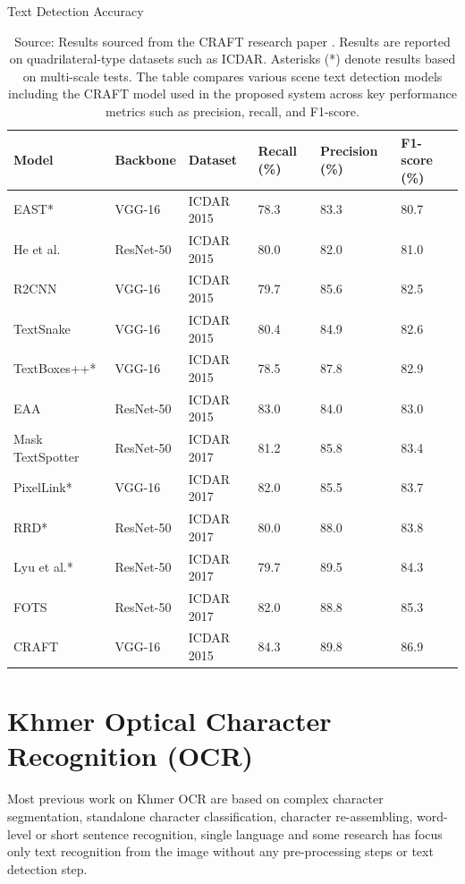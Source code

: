 {\begin{table}[H]
  \centering
  \caption{Text Detection Accuracy}
  \begin{tabularx}{\linewidth}{|L{3.5cm}|L{2.5cm}|L{2.5cm}|C{2cm}|C{2cm}|C{2cm}|}
    \hline
    \textbf{Model} & \textbf{Backbone} & \textbf{Dataset} & \textbf{Recall (\%)} & \textbf{Precision (\%)} & \textbf{F1-score (\%)} \\
    \hline
    EAST* & VGG-16 & ICDAR 2015 & 78.3 & 83.3 & 80.7 \\
    He et al. & ResNet-50 & ICDAR 2015 & 80.0 & 82.0 & 81.0 \\
    R2CNN & VGG-16 & ICDAR 2015 & 79.7 & 85.6 & 82.5 \\
    TextSnake & VGG-16 & ICDAR 2015 & 80.4 & 84.9 & 82.6 \\
    TextBoxes++* & VGG-16 & ICDAR 2015 & 78.5 & 87.8 & 82.9 \\
    EAA & ResNet-50 & ICDAR 2015 & 83.0 & 84.0 & 83.0 \\
    Mask TextSpotter & ResNet-50 & ICDAR 2017 & 81.2 & 85.8 & 83.4 \\
    PixelLink* & VGG-16 & ICDAR 2017 & 82.0 & 85.5 & 83.7 \\
    RRD* & ResNet-50 & ICDAR 2017 & 80.0 & 88.0 & 83.8 \\
    Lyu et al.* & ResNet-50 & ICDAR 2017 & 79.7 & 89.5 & 84.3 \\
    FOTS & ResNet-50 & ICDAR 2017 & 82.0 & 88.8 & 85.3 \\
    CRAFT & VGG-16 & ICDAR 2015 & 84.3 & 89.8 & 86.9 \\
    \hline
  \end{tabularx}
  \caption*{Source: Results sourced from the CRAFT research paper \cite{Hiremath_text_detection}. 
  Results are reported on quadrilateral-type datasets such as ICDAR. 
  Asterisks (*) denote results based on multi-scale tests. 
  The table compares various scene text detection models including the CRAFT model used in the proposed system across key performance metrics such as precision, recall, and F1-score.}
  \label{tab:text_detection_accuracy}
\end{table}


\section{Khmer Optical Character Recognition (OCR)}
\label{sec:khmer_OCR_literature}

Most previous work on Khmer OCR are based on complex character segmentation,
standalone character classification, character re-assembling,
word-level or short sentence recognition, single language and some research has focus only
text recognition from the image without any pre-processing steps or text
detection step.

}
